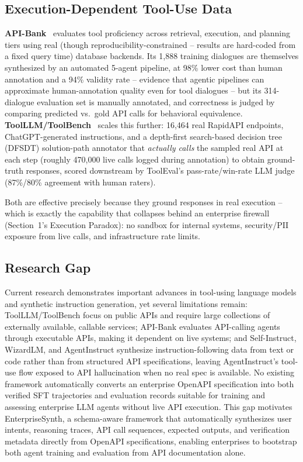 \documentclass[11pt]{article}
\begin{document}
\subsection{Execution-Dependent Tool-Use Data}
\textbf{API-Bank}~\cite{li2023apibank} evaluates tool proficiency across retrieval, execution, and
planning tiers using real (though reproducibility-constrained -- results are hard-coded from a
fixed query time) database backends. Its 1,888 training dialogues are themselves synthesized by an
automated 5-agent pipeline, at 98\% lower cost than human annotation and a 94\% validity rate --
evidence that agentic pipelines can approximate human-annotation quality even for tool dialogues --
but its 314-dialogue evaluation set is manually annotated, and correctness is judged by comparing
predicted vs.\ gold API calls for behavioral equivalence.
\textbf{ToolLLM/ToolBench}~\cite{qin2023toolbench} scales this further: 16,464 real RapidAPI
endpoints, ChatGPT-generated instructions, and a depth-first search-based decision tree (DFSDT)
solution-path annotator that \textit{actually calls} the sampled real API at each step (roughly
470,000 live calls logged during annotation) to obtain ground-truth responses, scored downstream by
ToolEval's pass-rate/win-rate LLM judge (87\%/80\% agreement with human raters).

Both are effective precisely because they ground responses in real execution -- which is exactly
the capability that collapses behind an enterprise firewall (Section~1's Execution Paradox): no
sandbox for internal systems, security/PII exposure from live calls, and infrastructure rate limits.

\subsection{Research Gap}
Current research demonstrates important advances in tool-using language models and synthetic
instruction generation, yet several limitations remain: ToolLLM/ToolBench focus on public APIs and
require large collections of externally available, callable services; API-Bank evaluates
API-calling agents through executable APIs, making it dependent on live systems; and
Self-Instruct, WizardLM, and AgentInstruct synthesize instruction-following data from text or code
rather than from structured API specifications, leaving AgentInstruct's tool-use flow exposed to
API hallucination when no real spec is available. No existing framework automatically converts an
enterprise OpenAPI specification into both verified SFT trajectories and evaluation records
suitable for training and assessing enterprise LLM agents without live API execution. This gap
motivates EnterpriseSynth, a schema-aware framework that automatically synthesizes user intents,
reasoning traces, API call sequences, expected outputs, and verification metadata directly from
OpenAPI specifications, enabling enterprises to bootstrap both agent training and evaluation from
API documentation alone.
\end{document}
